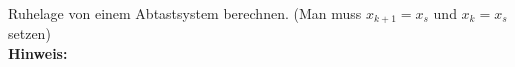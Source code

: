 \begin{question}[section=6,name={Ruhelage},difficulty=,type=mdl,tags={}]
	Ruhelage von einem Abtastsystem berechnen. (Man muss $x_{k+1} = x_s$ und $x_k = x_s$ setzen)
	\\ \textbf{Hinweis:}\\
	
\end{question}
\begin{solution}
	
\end{solution}